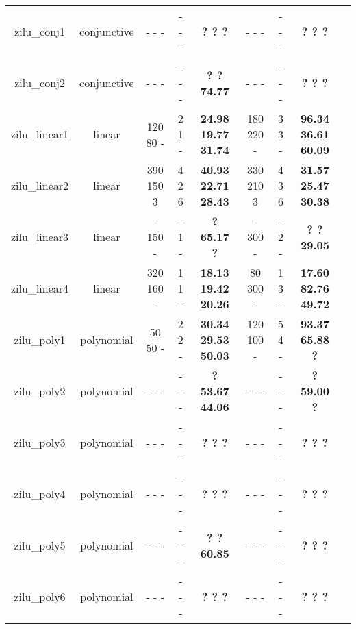 \begin{table}[t]
\begin{tabular}{l c | c c c | c c c | c }
\multicolumn{1}{|c|}{zilu\_conj1}		&conjunctive		&- - - &- - -&\textbf{? ? ?}				&- - - &- - -  &\textbf{? ? ?}					&\multicolumn{1}{|c|}{\cmark} \\
\multicolumn{1}{|c|}{zilu\_conj2}		&conjunctive		&- - - &- - -&\textbf{? ? 74.77}			&- - - &- - -  &\textbf{? ? ?}					&\multicolumn{1}{|c|}{\cmark} \\
\multicolumn{1}{|c|}{zilu\_linear1}		&linear				&120 80 - &2 1 -&\textbf{24.98 19.77 31.74}	&180 220 - &3 3 -  &\textbf{96.34 36.61 60.09}		&\multicolumn{1}{|c|}{\cmark} \\
\multicolumn{1}{|c|}{zilu\_linear2}		&linear				&390 150 3 &4 2 6 &\textbf{40.93 22.71 28.43}	&330 210 3 &4 3 6   &\textbf{31.57 25.47 30.38}		&\multicolumn{1}{|c|}{\cmark} \\
\multicolumn{1}{|c|}{zilu\_linear3}		&linear				&- 150 - &- 1 -&\textbf{? 65.17 ?}			&- 300 - &- 2 -  &\textbf{? ? 29.05}				&\multicolumn{1}{|c|}{\cmark} \\
\multicolumn{1}{|c|}{zilu\_linear4}		&linear				&320 160 - &1 1 -&\textbf{18.13 19.42 20.26}	&80 300 - &1 3 -  &\textbf{17.60 82.76 49.72}		&\multicolumn{1}{|c|}{\cmark} \\
\multicolumn{1}{|c|}{zilu\_poly1}		&polynomial			&50 50 - &2 2 -&\textbf{30.34 29.53 50.03}	&120 100 - &5 4 -  &\textbf{93.37 65.88 ?}			&\multicolumn{1}{|c|}{\cmark} \\
\multicolumn{1}{|c|}{zilu\_poly2}		&polynomial			&- - - &- - -&\textbf{? 53.67 44.06}		&- - - &- - -  &\textbf{? 59.00 ?}				&\multicolumn{1}{|c|}{\cmark} \\
\multicolumn{1}{|c|}{zilu\_poly3}		&polynomial			&- - - &- - -&\textbf{? ? ?}				&- - - &- - -  &\textbf{? ? ?}					&\multicolumn{1}{|c|}{\cmark} \\
\multicolumn{1}{|c|}{zilu\_poly4}		&polynomial			&- - - &- - -&\textbf{? ? ?}				&- - - &- - -  &\textbf{? ? ?}					&\multicolumn{1}{|c|}{\cmark} \\
\multicolumn{1}{|c|}{zilu\_poly5}		&polynomial			&- - - &- - -&\textbf{? ? 60.85}			&- - - &- - -  &\textbf{? ? ?}					&\multicolumn{1}{|c|}{\cmark} \\
\multicolumn{1}{|c|}{zilu\_poly6}		&polynomial			&- - - &- - -&\textbf{? ? ?}				&- - - &- - -  &\textbf{? ? ?}					&\multicolumn{1}{|c|}{\cmark} \\







\end{tabular}
\end{table}
